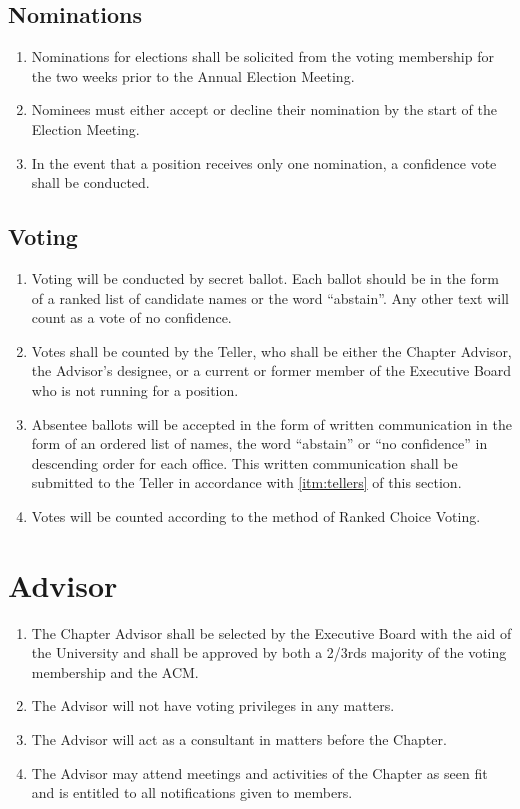 \documentclass[12pt, letterpaper, oneside]{book}
\begin{document}
\section{Nominations}
\begin{enumerate}
    \item Nominations for elections shall be solicited from the voting
        membership for the two weeks prior to the Annual Election Meeting.
    \item Nominees must either accept or decline their nomination by the start
        of the Election Meeting.
    \item In the event that a position receives only one nomination, a
        confidence vote shall be conducted.
\end{enumerate}

\section{Voting} \label{sec:voting}
\begin{enumerate}
    \item \label{itm:tellers} Voting will be conducted by secret ballot. Each ballot should be in
        the form of a ranked list of candidate names or the word ``abstain''.
        Any other text will count as a vote of no confidence.
    \item Votes shall be counted by the Teller, who shall be either the Chapter
        Advisor, the Advisor's designee, or a current or former member of the
        Executive Board who is not running for a position.
    \item Absentee ballots will be accepted in the form of written communication
        in the form of an ordered list of names, the word ``abstain'' or ``no
        confidence'' in descending order for each office. This written
        communication shall be submitted to the Teller in accordance with
        \cref{itm:tellers} of this section.
    \item Votes will be counted according to the method of Ranked Choice Voting.
\end{enumerate}

\chapter{Advisor}
\begin{enumerate}
    \item The Chapter Advisor shall be selected by the Executive Board with the
        aid of the University and shall be approved by both a 2/3rds majority of
        the voting membership and the ACM.
    \item The Advisor will not have voting privileges in any matters.
    \item The Advisor will act as a consultant in matters before the Chapter.
    \item The Advisor may attend meetings and activities of the Chapter as seen
        fit and is entitled to all notifications given to members.
\end{enumerate}
\end{document}
